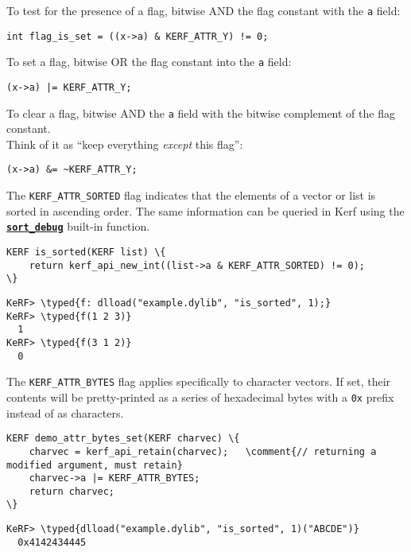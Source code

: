 \documentclass{article}
\newcommand{\typed}[1]{\textcolor{TealBlue}{#1}}
\newcommand{\comment}[1]{\textcolor{Orange}{#1}}
\newcommand{\primu}[2]{\hyperref[prim:#2]{\textbf{\texttt{#1}}}}
\begin{document}
To test for the presence of a flag, bitwise AND the flag constant with the \texttt{a} field:
\begin{Verbatim}
int flag_is_set = ((x->a) & KERF_ATTR_Y) != 0;
\end{Verbatim}

To set a flag, bitwise OR the flag constant into the \texttt{a} field:
\begin{Verbatim}
(x->a) |= KERF_ATTR_Y;
\end{Verbatim}

To clear a flag, bitwise AND the \texttt{a} field with the bitwise complement of the flag constant. \\Think of it as ``keep everything \emph{except} this flag'':
\begin{Verbatim}
(x->a) &= ~KERF_ATTR_Y;
\end{Verbatim}

\vspace{0.5cm}

The \texttt{KERF\_ATTR\_SORTED} flag indicates that the elements of a vector or list is sorted in ascending order. The same information can be queried in Kerf using the \primu{sort\_debug}{sortDebug} built-in function.
\begin{Verbatim}
KERF is_sorted(KERF list) \{
	return kerf_api_new_int((list->a & KERF_ATTR_SORTED) != 0);
\}
\end{Verbatim}
\begin{Verbatim}
KeRF> \typed{f: dlload("example.dylib", "is_sorted", 1);}
KeRF> \typed{f(1 2 3)}
  1
KeRF> \typed{f(3 1 2)}
  0
\end{Verbatim}

The \texttt{KERF\_ATTR\_BYTES} flag applies specifically to character vectors. If set, their contents will be pretty-printed as a series of hexadecimal bytes with a \texttt{0x} prefix instead of as characters.
\begin{Verbatim}
KERF demo_attr_bytes_set(KERF charvec) \{
	charvec = kerf_api_retain(charvec);   \comment{// returning a modified argument, must retain}
	charvec->a |= KERF_ATTR_BYTES;
	return charvec;
\}
\end{Verbatim}
\begin{Verbatim}
KeRF> \typed{dlload("example.dylib", "is_sorted", 1)("ABCDE")}
  0x4142434445
\end{Verbatim}
\end{document}
